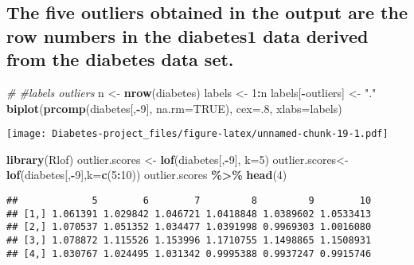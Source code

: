 \documentclass[
]{article}
\newenvironment{Shaded}{\begin{snugshade}}{\end{snugshade}}
\newcommand{\AttributeTok}[1]{\textcolor[rgb]{0.13,0.29,0.53}{#1}}
\newcommand{\CommentTok}[1]{\textcolor[rgb]{0.56,0.35,0.01}{\textit{#1}}}
\newcommand{\ConstantTok}[1]{\textcolor[rgb]{0.56,0.35,0.01}{#1}}
\newcommand{\DecValTok}[1]{\textcolor[rgb]{0.00,0.00,0.81}{#1}}
\newcommand{\FunctionTok}[1]{\textcolor[rgb]{0.13,0.29,0.53}{\textbf{#1}}}
\newcommand{\NormalTok}[1]{#1}
\newcommand{\OtherTok}[1]{\textcolor[rgb]{0.56,0.35,0.01}{#1}}
\newcommand{\SpecialCharTok}[1]{\textcolor[rgb]{0.81,0.36,0.00}{\textbf{#1}}}
\newcommand{\StringTok}[1]{\textcolor[rgb]{0.31,0.60,0.02}{#1}}
\begin{document}
\hypertarget{the-five-outliers-obtained-in-the-output-are-the-row-numbers-in-the-diabetes1-data-derived-from-the-diabetes-data-set.}{%
\subsection{\texorpdfstring{\textbf{The five outliers obtained in the
output are the row numbers in the diabetes1 data derived from the
diabetes data
set.}}{The five outliers obtained in the output are the row numbers in the diabetes1 data derived from the diabetes data set.}}\label{the-five-outliers-obtained-in-the-output-are-the-row-numbers-in-the-diabetes1-data-derived-from-the-diabetes-data-set.}}

\begin{Shaded}
\begin{Highlighting}[]
\CommentTok{\# \#labels outliers}
\NormalTok{n }\OtherTok{\textless{}{-}} \FunctionTok{nrow}\NormalTok{(diabetes)}
\NormalTok{labels }\OtherTok{\textless{}{-}} \DecValTok{1}\SpecialCharTok{:}\NormalTok{n}
\NormalTok{labels[}\SpecialCharTok{{-}}\NormalTok{outliers] }\OtherTok{\textless{}{-}} \StringTok{"."}
\FunctionTok{biplot}\NormalTok{(}\FunctionTok{prcomp}\NormalTok{(diabetes[,}\SpecialCharTok{{-}}\DecValTok{9}\NormalTok{], }\AttributeTok{na.rm=}\ConstantTok{TRUE}\NormalTok{), }\AttributeTok{cex=}\NormalTok{.}\DecValTok{8}\NormalTok{, }\AttributeTok{xlabs=}\NormalTok{labels)}
\end{Highlighting}
\end{Shaded}

\texttt{[image: Diabetes-project\_files/figure-latex/unnamed-chunk-19-1.pdf]}

\begin{Shaded}
\begin{Highlighting}[]
\FunctionTok{library}\NormalTok{(Rlof)}
\NormalTok{outlier.scores }\OtherTok{\textless{}{-}} \FunctionTok{lof}\NormalTok{(diabetes[,}\SpecialCharTok{{-}}\DecValTok{9}\NormalTok{], }\AttributeTok{k=}\DecValTok{5}\NormalTok{)}
\NormalTok{outlier.scores}\OtherTok{\textless{}{-}}\FunctionTok{lof}\NormalTok{(diabetes[,}\SpecialCharTok{{-}}\DecValTok{9}\NormalTok{],}\AttributeTok{k=}\FunctionTok{c}\NormalTok{(}\DecValTok{5}\SpecialCharTok{:}\DecValTok{10}\NormalTok{))}
\NormalTok{outlier.scores }\SpecialCharTok{\%\textgreater{}\%} \FunctionTok{head}\NormalTok{(}\DecValTok{4}\NormalTok{)}
\end{Highlighting}
\end{Shaded}

\begin{verbatim}
##             5        6        7         8         9        10
## [1,] 1.061391 1.029842 1.046721 1.0418848 1.0389602 1.0533413
## [2,] 1.070537 1.051352 1.034477 1.0391998 0.9969303 1.0016080
## [3,] 1.078872 1.115526 1.153996 1.1710755 1.1498865 1.1508931
## [4,] 1.030767 1.024495 1.031342 0.9995388 0.9937247 0.9915746
\end{verbatim}
\end{document}
